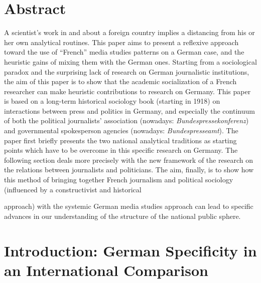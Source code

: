 \documentclass{tufte-handout}
\begin{document}
\begin{titlepage}
\begin{fullwidth}
\end{fullwidth}

\vspace*{1em}


\hypertarget{abstract}{%
\section{Abstract}\label{abstract}}

A scientist's work in and about a foreign country implies a distancing
from his or her own analytical routines. This paper aims to present a
reflexive approach toward the use of ``French'' media studies patterns
on a German case, and the heuristic gains of mixing them with the German
ones. Starting from a sociological paradox and the surprising lack of
research on German journalistic institutions, the aim of this paper is
to show that the academic socialization of a French researcher can make
heuristic contributions to research on Germany. This paper is based on a
long-term historical sociology book (starting in 1918) on interactions
between press and politics in Germany, and especially the continuum of
both the political journalists' association (nowadays:
\emph{Bundespressekonferenz}) and governmental spokesperson agencies
(nowadays: \emph{Bundespresseamt}). The paper first briefly presents the
two national analytical traditions as starting points which have to be
overcome in this specific research on Germany. The following section
deals more precisely with the new framework of the research on the
relations between journalists and politicians. The aim, finally, is to
show how this method of bringing together French journalism and
political sociology (influenced by a constructivist and historical


\enlargethispage{2\baselineskip}

\vspace*{2em}



 \end{titlepage}

\noindent approach) with the systemic German media studies approach can lead to
specific advances in our understanding of the structure of the national
public sphere.


\vspace*{2em}



\hypertarget{introduction-german-specificity-in-an-international-comparison}{%
\section{Introduction: German Specificity in an International Comparison}\label{introduction-german-specificity-in-an-international-comparison}}
\end{document}
